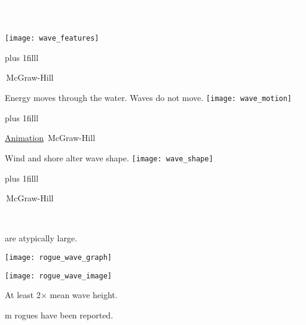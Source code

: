 \documentclass[t,handout]{beamer}  %
\begin{document}

{
\begin{frame}[b]{\textcolor{white}{Sublittoral ecosystems.}}
\tiny\textcolor{white}{Seafloor Topography V4.0, \textcopyright\,W.H.F. Smith \& D.T. Sandwell, 1996.}
\end{frame}
}

\begin{frame}[t]{}
\texttt{[image: wave\_features]}

\vskip0pt plus 1filll

\tiny\textcopyright\,McGraw-Hill
\end{frame}


\begin{frame}[t]{Energy moves through the water. Waves do not move.}
\texttt{[image: wave\_motion]}

\vskip0pt plus 1filll

\tiny\href{https://fronkonstin.com/2018/12/19/spinning-pins/}{Animation} \hfill \textcopyright\,McGraw-Hill
\end{frame}

\begin{frame}[t]{Wind and shore alter wave shape.}
\texttt{[image: wave\_shape]}

\vskip0pt plus 1filll

\tiny\textcopyright\,McGraw-Hill
\end{frame}

{
\begin{frame}[b]

\tiny\textcolor{white}{2010 Mavericks Competition photo by Shalom Jacobovitz, Wikimedia Commons.}
\end{frame}
}

\begin{frame}[t]{ are atypically large.}
\vspace*{-\baselineskip}
\begin{multicols}{2}

	{\centering\texttt{[image: rogue\_wave\_graph]}

	\texttt{[image: rogue\_wave\_image]}\par}

\columnbreak
	\hangpara At least 2$\times$ mean wave height.
	
	 m rogues have been reported.
	
\end{multicols}
\end{frame}
\end{document}

